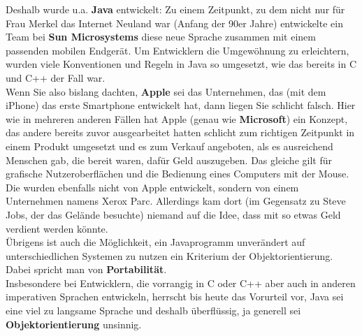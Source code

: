 Deshalb wurde u.a. \textbf{Java} entwickelt: Zu einem Zeitpunkt, zu dem nicht nur für Frau Merkel das Internet Neuland war (Anfang der 90er Jahre) entwickelte ein Team bei \textbf{Sun Microsystems} diese neue Sprache zusammen mit einem passenden mobilen Endgerät. Um Entwicklern die Umgewöhnung zu erleichtern, wurden viele Konventionen und Regeln in Java so umgesetzt, wie das bereits in C und C++ der Fall war.\\

Wenn Sie also bislang dachten, \textbf{Apple} sei das Unternehmen, das (mit dem iPhone) das erste Smartphone entwickelt hat, dann liegen Sie schlicht falsch. Hier wie in mehreren anderen Fällen hat Apple (genau wie \textbf{Microsoft}) ein Konzept, das andere bereits zuvor ausgearbeitet hatten schlicht zum richtigen Zeitpunkt in einem Produkt umgesetzt und es zum Verkauf angeboten, als es ausreichend Menschen gab, die bereit waren, dafür Geld auszugeben. Das gleiche gilt für grafische Nutzeroberflächen und die Bedienung eines Computers mit der Mouse. Die wurden ebenfalls nicht von Apple entwickelt, sondern von einem Unternehmen namens Xerox Parc. Allerdings kam dort (im Gegensatz zu Steve Jobs, der das Gelände besuchte) niemand auf die Idee, dass mit so etwas Geld verdient werden könnte.\\

Übrigens ist auch die Möglichkeit, ein Javaprogramm unverändert auf unterschiedlichen Systemen zu nutzen ein Kriterium der Objektorientierung. Dabei spricht man von \textbf{Portabilität}. \\

Insbesondere bei Entwicklern, die vorrangig in C oder C++ aber auch in anderen imperativen Sprachen entwickeln, herrscht bis heute das Vorurteil vor, Java sei eine viel zu langsame Sprache und deshalb überflüssig, ja generell sei \textbf{Objektorientierung} unsinnig.\\

